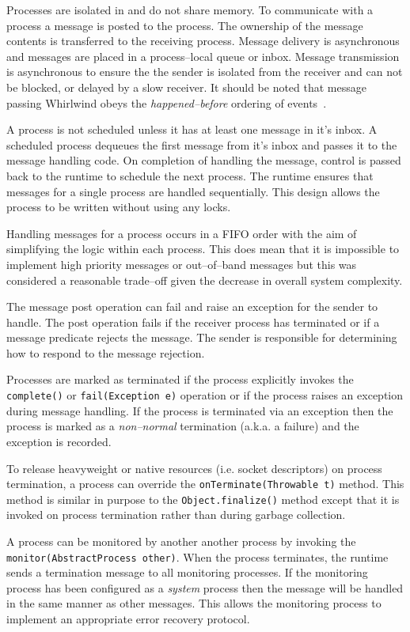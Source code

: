 \documentclass[conference]{IEEEtran}
\begin{document}
Processes are isolated in and do not share memory. To communicate with a process a message is posted to the process. The ownership of the message contents is transferred to the receiving process. Message delivery is asynchronous and messages are placed in a process--local queue or inbox. Message transmission is asynchronous to ensure the the sender is isolated from the receiver and can not be blocked, or delayed by a slow receiver. It should be noted that message passing Whirlwind obeys the \emph{happened--before} ordering of events~\cite{lamport78}.

A process is not scheduled unless it has at least one message in it's inbox. A scheduled process dequeues the first message from it's inbox and passes it to the message handling code. On completion of handling the message, control is passed back to the runtime to schedule the next process. The runtime ensures that messages for a single process are handled sequentially. This design allows the process to be written without using any locks.


Handling messages for a process occurs in a FIFO order with the aim of simplifying the logic within each process. This does mean that it is impossible to implement high priority messages or out--of--band messages but this was considered a reasonable trade--off given the decrease in overall system complexity.

The message post operation can fail and raise an exception for the sender to handle. The post operation fails if the receiver process has terminated or if a message predicate rejects the message. The sender is responsible for determining how to respond to the message rejection.

Processes are marked as terminated if the process explicitly invokes the \verb+complete()+ or \verb+fail(Exception e)+ operation or if the process raises an exception during message handling. If the process is terminated via an exception then the process is marked as a \emph{non--normal} termination (a.k.a. a failure) and the exception is recorded. 

To release heavyweight or native resources (i.e. socket descriptors) on process termination, a process can override the \verb+onTerminate(Throwable t)+ method. This method is similar in purpose to the \verb+Object.finalize()+ method except that it is invoked on process termination rather than during garbage collection. 

A process can be monitored by another another process by invoking the \verb+monitor(AbstractProcess other)+. When the process terminates, the runtime sends a termination message to all monitoring processes. If the monitoring process has been configured as a \emph{system} process then the message will be handled in the same manner as other messages. This allows the monitoring process to implement an appropriate error recovery protocol.
\end{document}
